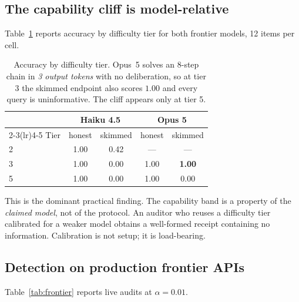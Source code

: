 \documentclass[11pt]{article}
\theoremstyle{definition}
\begin{document}
\subsection{The capability cliff is model-relative}
\label{sec:cliff}

Table~\ref{tab:cliff} reports accuracy by difficulty tier for both frontier
models, 12 items per cell.

\begin{table}[t]
\centering
\begin{tabular}{lcccc}
\toprule
& \multicolumn{2}{c}{Haiku 4.5} & \multicolumn{2}{c}{Opus 5} \\
\cmidrule(lr){2-3}\cmidrule(lr){4-5}
Tier & honest & skimmed & honest & skimmed \\
\midrule
2 & 1.00 & 0.42 & --- & --- \\
3 & 1.00 & 0.00 & 1.00 & \textbf{1.00} \\
5 & 1.00 & 0.00 & 1.00 & 0.00 \\
\bottomrule
\end{tabular}
\caption{Accuracy by difficulty tier. Opus~5 solves an 8-step chain in
\emph{3 output tokens} with no deliberation, so at tier 3 the skimmed endpoint
also scores $1.00$ and every query is uninformative. The cliff appears only at
tier 5.}
\label{tab:cliff}
\end{table}

This is the dominant practical finding. The capability band is a property of the
\emph{claimed model}, not of the protocol. An auditor who reuses a difficulty
tier calibrated for a weaker model obtains a well-formed receipt containing no
information. Calibration is not setup; it is load-bearing.

\subsection{Detection on production frontier APIs}

Table~\ref{tab:frontier} reports live audits at $\alpha = 0.01$.
\end{document}
